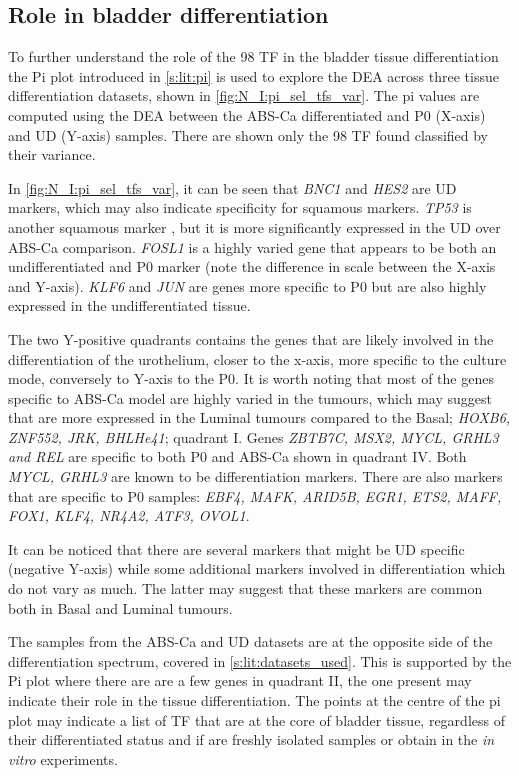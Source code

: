 \subsection{Role in bladder differentiation} \label{s:N:sel_tf_diff_status}


To further understand the role of the 98 TF in the bladder tissue differentiation the Pi plot introduced in \cref{s:lit:pi} is used to explore the \gls{DEA} across three tissue differentiation datasets, shown in \cref{fig:N_I:pi_sel_tfs_var}. The pi values are computed using the DEA between the ABS-Ca differentiated and P0 (X-axis) and UD (Y-axis) samples. There are shown only the 98 TF found classified by their variance.

In \cref{fig:N_I:pi_sel_tfs_var}, it can be seen that \textit{BNC1} and \textit{HES2} are UD markers, which may also indicate specificity for squamous markers. \textit{TP53} is another squamous marker \citep{Robertson2017-mg}, but it is more significantly expressed in the UD over ABS-Ca comparison. \textit{FOSL1} is a highly varied gene that appears to be both an undifferentiated and P0 marker (note the difference in scale between the X-axis and Y-axis). \textit{KLF6} and \textit{JUN} are genes more specific to P0 but are also highly expressed in the undifferentiated tissue.

The two Y-positive quadrants contains the genes that are likely involved in the differentiation of the urothelium, closer to the x-axis, more specific to the culture mode, conversely to Y-axis to the P0. It is worth noting that most of the genes specific to ABS-Ca model are highly varied in the tumours, which may suggest that are more expressed in the Luminal tumours compared to the Basal; \textit{HOXB6, ZNF552, JRK, BHLHe41}; quadrant I. Genes \textit{ZBTB7C, MSX2, MYCL, GRHL3 and REL} are specific to both P0 and ABS-Ca shown in quadrant IV. Both \textit{MYCL, GRHL3} are known to be differentiation markers. There are also markers that are specific to P0 samples: \textit{EBF4, MAFK, ARID5B, EGR1, ETS2, MAFF, FOX1, KLF4, NR4A2, ATF3, OVOL1}. 

It can be noticed that there are several markers that might be UD specific (negative Y-axis) while some additional markers involved in differentiation which do not vary as much. The latter may suggest that these markers are common both in Basal and Luminal tumours. 

The samples from the ABS-Ca and UD datasets are at the opposite side of the differentiation spectrum, covered in \cref{s:lit:datasets_used}. This is supported by the Pi plot where there are are a few genes in quadrant II, the one present may indicate their role in the tissue differentiation. The points at the centre of the pi plot may indicate a list of TF that are at the core of bladder tissue, regardless of their differentiated status and if are freshly isolated samples or obtain in the \textit{in vitro} experiments.


